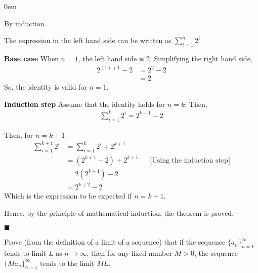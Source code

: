 \documentclass[12pt]{article}
\renewcommand{\qed}{\hfill$\blacksquare$}
\renewenvironment{proof}{\begin{addmargin}[1em]{0em}\begin{newproof}}{\end{newproof}\end{addmargin}\qed}
\newenvironment{problem}[2][Problem]{\begin{trivlist}
\item[\hskip \labelsep {\bfseries #1}\hskip \labelsep {\bfseries #2.}]}{\end{trivlist}}
\begin{document}
\begin{proof}
By induction.

The expression in the left hand side can be written as $\sum_{i=1}^{n} 2^{i}$

\hfill \break
\textbf{Base case} \quad When $n=1$, the left hand side is 2. Simplifying the right hand side,
\begin{align*}
    2^{(1)+1} - 2 &= 2^2 - 2 \\
    &= 2
\end{align*}
So, the identity is valid for $n=1$.

\hfill \break
\textbf{Induction step} \quad Assume that the identity holds for $n=k$. Then,
\begin{align*}
    \sum_{i=1}^{k} 2^{i} = 2^{k+1} - 2
\end{align*}

Then, for $n=k+1$
\begin{align*}
    \sum_{i=1}^{k+1} 2^{i} &= \sum_{i=1}^{k} 2^{i} + 2^{k+1} \\
                           &= (2^{k+1} - 2) + 2^{k+1} &&\text{[Using the induction step]} \\
                           &= 2(2^{k+1}) - 2 \\
                           &= 2^{k+2} - 2
\end{align*}
Which is the expression to be expected if $n=k+1$.

\hfill \break
Hence, by the principle of mathematical induction, the theorem is proved.
\end{proof}

\pagebreak


\begin{problem}{8}
    Prove (from the definition of a limit of a sequence) that if the sequence $\{a_n\}_{n=1}^{\infty}$ tends to limit $L$ as $n\to\infty$, then for any fixed number $M > 0$, the sequence $\{Ma_n\}_{n=1}^{\infty}$ tends to the limit $ML$.
\end{problem}
\end{document}
